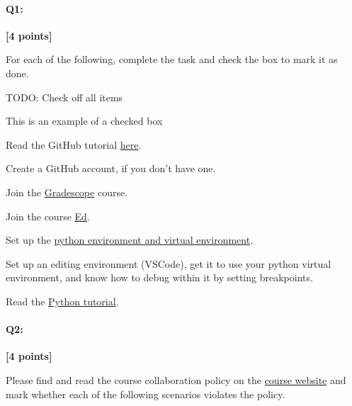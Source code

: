 \documentclass[11pt]{article}
\newcommand{\cmark}{\ding{51}}%
\newcommand{\done}{\rlap{$\square$}{\raisebox{2pt}{\large\hspace{1pt}\cmark}}%
\hspace{-2.5pt}}
\begin{document}
\pagebreak


\paragraph{Q1:} \textbf{[4 points]}
\begin{tcolorbox}[colback=orange!5!white,colframe=orange!75!black]
For each of the following, complete the task and check the box to mark it as done.
\end{tcolorbox}

\begin{tcolorbox}[colback=white!5!white,colframe=green!75!black]
TODO: Check off all items

\begin{todolist}
    \item[\done] This is an example of a checked box
    \item Read the GitHub tutorial \href{https://browncsci1430.github.io/webpage/resources/github_guide/}{here}.
    \item Create a GitHub account, if you don't have one.
    \item Join the \href{https://www.gradescope.com/}{Gradescope} course.
    \item Join the course \href{https://edstem.org/us/courses/19571/discussion/}{Ed}.
    \item Set up the \href{https://browncsci1430.github.io/webpage/resources/python_setup/}{python environment and virtual environment}.
    \item Set up an editing environment (VSCode), get it to use your python virtual environment, and know how to debug within it by setting breakpoints.
    \item Read the \href{https://browncsci1430.github.io/webpage/resources/python_tutorial/}{Python tutorial}.
\end{todolist}
\end{tcolorbox}

\pagebreak

\paragraph{Q2:} 
\textbf{[4 points]}
\begin{tcolorbox}[colback=orange!5!white,colframe=orange!75!black]
Please find and read the course collaboration policy on the \href{https://browncsci1430.github.io/webpage/#policy-section}{course website} and mark whether each of the following scenarios violates the policy.
\end{tcolorbox}
\end{document}
